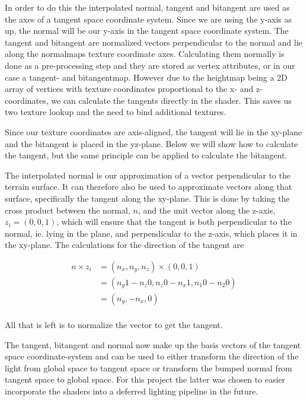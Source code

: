 In order to do this the interpolated normal, tangent and bitangent are
used as the axes of a tangent space coordinate system. Since we are
using the y-axis as up, the normal will be our y-axis in the tangent
space coordinate system. The tangent and bitangent are normalized
vectors perpendicular to the normal and lie along the normalmaps
texture coordinate axes. Calculating them normally is done as a
pre-processing step and they are stored as vertex attributes, or in our
case a tangent- and bitangentmap. However due to the heightmap being a
2D array of vertices with texture coordinates proportional to the x-
and z-coordinates, we can calculate the tangents directly in the
shader. This saves us two texture lookup and the need to bind
additional textures.

Since our texture coordinates are axis-aligned, the tangent will lie
in the xy-plane and the bitangent is placed in the yz-plane. Below we
will show how to calculate the tangent, but the same principle can be
applied to calculate the bitangent.

The interpolated normal is our approximation of a vector perpendicular
to the terrain surface. It can therefore also be used to approximate
vectors along that surface, specifically the tangent along the
xy-plane. This is done by taking the cross product between the normal,
$n$, and the unit vector along the z-axis, $z_i = (0,0,1)$, which will
ensure that the tangent is both perpendicular to the normal, ie.
lying in the plane, and perpendicular to the z-axis, which places it
in the xy-plane. The calculations for the direction of the tangent are

\begin{displaymath}
  \begin{array}{rl}
  n \times z_i &= (n_x, n_y, n_z) \times (0,0,1)\\
  &= (n_y 1 - n_z 0, n_z 0 - n_x 1, n_1 0 - n_2 0) \\
  &= (n_y, - n_x, 0) \\
  \end{array}
\end{displaymath}

All that is left is to normalize the vector to get the tangent.

The tangent, bitangent and normal now make up the basis vectors of the
tangent space coordinate-system and can be used to either transform
the direction of the light from global space to tangent space or
transform the bumped normal from tangent space to global space. For
this project the latter was chosen to easier incorporate the shaders
into a deferred lighting pipeline in the future.

